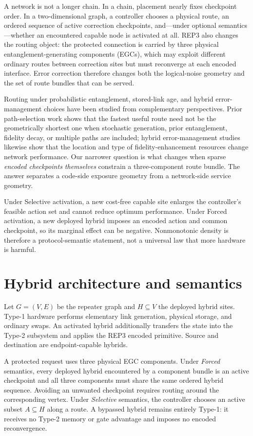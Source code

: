 \documentclass[aps,prx,reprint,superscriptaddress,nofootinbib,longbibliography,floatfix]{revtex4-2}
\begin{document}
A network is not a longer chain. In a chain, placement nearly fixes checkpoint order. In a two-dimensional graph, a controller chooses a physical route, an ordered sequence of active correction checkpoints, and---under optional semantics---whether an encountered capable node is activated at all. REP3 also changes the routing object: the protected connection is carried by three physical entanglement-generating components (EGCs), which may exploit different ordinary routes between correction sites but must reconverge at each encoded interface. Error correction therefore changes both the logical-noise geometry and the set of route bundles that can be served.

Routing under probabilistic entanglement, stored-link age, and hybrid error-management choices have been studied from complementary perspectives. Prior path-selection work shows that the fastest useful route need not be the geometrically shortest one when stochastic generation, prior entanglement, fidelity decay, or multiple paths are included; hybrid error-management studies likewise show that the location and type of fidelity-enhancement resources change network performance. Our narrower question is what changes when sparse \emph{encoded checkpoints themselves} constrain a three-component route bundle. The answer separates a code-side exposure geometry from a network-side service geometry.

Under Selective activation, a new cost-free capable site enlarges the controller's feasible action set and cannot reduce optimum performance. Under Forced activation, a new deployed hybrid imposes an encoded action and common checkpoint, so its marginal effect can be negative. Nonmonotonic density is therefore a protocol-semantic statement, not a universal law that more hardware is harmful.

\section{Hybrid architecture and semantics}
Let $G=(V,E)$ be the repeater graph and $H\subseteq V$ the deployed hybrid sites. Type-1 hardware performs elementary link generation, physical storage, and ordinary swaps. An activated hybrid additionally transfers the state into the Type-2 subsystem and applies the REP3 encoded primitive. Source and destination are endpoint-capable hybrids.

A protected request uses three physical EGC components. Under \emph{Forced} semantics, every deployed hybrid encountered by a component bundle is an active checkpoint and all three components must share the same ordered hybrid sequence. Avoiding an unwanted checkpoint requires routing around the corresponding vertex. Under \emph{Selective} semantics, the controller chooses an active subset $A\subseteq H$ along a route. A bypassed hybrid remains entirely Type-1: it receives no Type-2 memory or gate advantage and imposes no encoded reconvergence.
\end{document}
